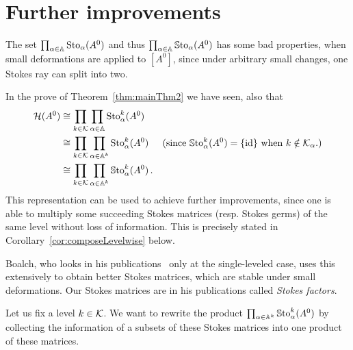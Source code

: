 \section{Further improvements}\label{sec:furtherImprovements}
The set $\prod_{\alpha\in\mathbb{A}}\operatorname{Sto}_\alpha(A^0)$ and thus
$\prod_{\alpha\in\mathbb{A}}\operatorname{\mathbb{S}to}_\alpha(A^0)$ has some bad properties, when small
deformations are applied to $[A^0]$, since under arbitrary small changes, one
Stokes ray can split into two.

In the prove of Theorem~\ref{thm:mainThm2} we have seen,  also that
\begin{align*}
  \mathcal{H}(A^0)&\cong\prod_{k\in\mathcal{K}}\prod_{\alpha\in\mathbb{A}}\operatorname{Sto}_\alpha^k(A^0)
  \\&\cong\prod_{k\in\mathcal{K}}\prod_{\alpha\in\mathbb{A}^k}\operatorname{Sto}_\alpha^k(A^0)
  &\text{(since $\operatorname{\mathbb{S}to}_{\alpha}^{k}(A^0)=\{\operatorname{id}\}$ when $k\notin\mathcal{K}_\alpha$.)}
  \\&\cong\prod_{k\in\mathcal{K}}\prod_{\alpha\in\mathbb{A}^k}\operatorname{\mathbb{S}to}_\alpha^k(A^0) \,.
\end{align*}
This representation can be used to achieve further improvements, since one is
able to multiply some succeeding Stokes matrices (resp. Stokes germs) of the
same level without loss of information.
This is precisely stated in Corollary~\ref{cor:composeLevelwise} below.

\TODO[move?]
Boalch, who looks in his publications~\cite{boalch,thboalch} only at the
single-leveled case, uses this extensively to obtain better Stokes matrices,
which are stable under small deformations. Our Stokes matrices are in his
publications called \emph{Stokes factors}.

Let us fix a level $k\in\mathcal{K}$. We want to rewrite the product
$\prod_{\alpha\in\mathbb{A}^k}\operatorname{\mathbb{S}to}_\alpha^k(A^0)$ by collecting the information of a
subsets of these Stokes matrices into one product of these matrices.

